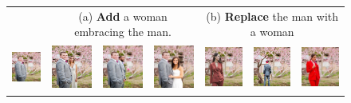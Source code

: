 \documentclass{article}
\begin{document}
\begin{figure}[h!]
\begin{center}
\begin{tabular}{@{\hskip 1.2pt} p{\dimexpr\textwidth/9\relax}
                   @{\hskip 5pt} p{\dimexpr\textwidth/9\relax}
                   @{\hskip 1.2pt} p{\dimexpr\textwidth/9\relax}
                   @{\hskip 1.2pt} p{\dimexpr\textwidth/9\relax}
                   @{\hskip 5pt} p{\dimexpr\textwidth/9\relax}
                   @{\hskip 1.2pt} p{\dimexpr\textwidth/9\relax}
                   @{\hskip 1.2pt} p{\dimexpr\textwidth/9\relax} @{}}

 & \multicolumn{3}{c}{\tiny (a) \textbf{Add} a woman embracing the man.} & 
\multicolumn{3}{c}{\tiny (b) \textbf{Replace} the man with a woman}  \\
\includegraphics[width=\linewidth,  height=1.5cm]{figures/f2/1_1.png} &
\includegraphics[width=\linewidth,  height=1.5cm]{figures/f2/1_2.png} &
\includegraphics[width=\linewidth,  height=1.5cm]{figures/f2/1_3.jpg} &
\includegraphics[width=\linewidth,  height=1.5cm]{figures/f2/1_4.jpg} &
\includegraphics[width=\linewidth,  height=1.5cm]{figures/f2/1_5.jpg} &
\includegraphics[width=\linewidth,  height=1.5cm]{figures/f2/1_6.png} &
\includegraphics[width=\linewidth,  height=1.5cm]{figures/f2/1_7.jpg} \\[-1pt]


\end{tabular}
\end{center}
\end{figure}
\end{document}
